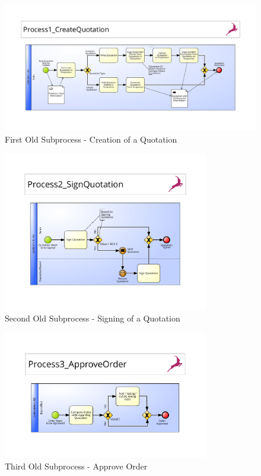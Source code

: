 \begin{figure}[h]
	\begin{center}
		\includegraphics[width=\textheight,angle=90]{./appendix/pbmnOld/0-1_createQuote.pdf}
		\caption{First Old Subprocess - Creation of a Quotation}\label{fig:0-1_sub}
	\end{center}
\end{figure} 

\begin{figure}[h]
	\begin{center}
		\includegraphics[width=0.8\textwidth]{./appendix/pbmnOld/0-2_signQuote.pdf}
		\caption{Second Old Subprocess - Signing of a Quotation}\label{fig:0-2_sub}
	\end{center}
\end{figure}

\begin{figure}[h]
	\begin{center}
		\includegraphics[width=0.8\textwidth]{./appendix/pbmnOld/0-3_approveOrder.pdf}
		\caption{Third Old Subprocess - Approve Order}\label{fig:0-3_sub}
	\end{center}
\end{figure}

